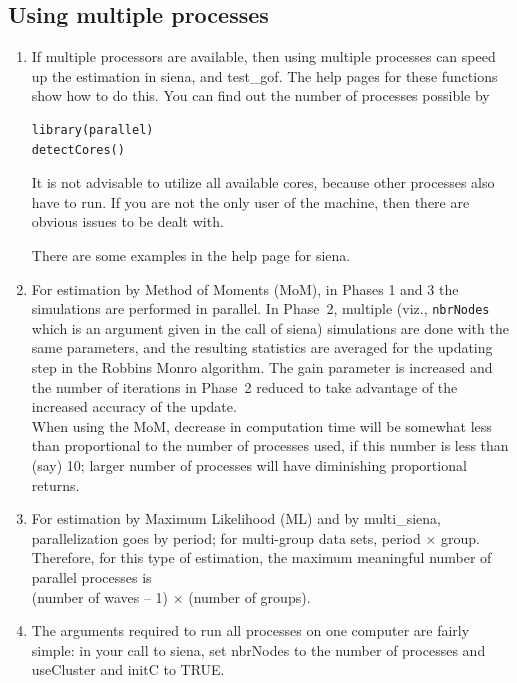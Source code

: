 \documentclass[a4paper,fleqn,11pt]{article}
\newcommand{\+}{\, + \,}
\newcommand{\sfn}[1]{\textsf{#1}}
\begin{document}
\subsection{Using multiple processes}
\label{S_multipleProcesses}
\begin{enumerate}
\item
  If multiple processors are available, then using
  multiple processes can speed up the estimation in \textsf{siena},
  and \textsf{test\_gof}.
  The help pages for these functions show how to do this.
  You can find out the number of processes possible by
\begin{verbatim}
library(parallel)
detectCores()
\end{verbatim}
  It is not advisable to utilize all available cores, because
  other processes also have to run. If you are not the only user
  of the machine, then there are obvious issues to be dealt with.

  There are some examples in the help page for \textsf{siena}.
\item For estimation by Method of Moments (MoM), in Phases 1 and 3
  the simulations are performed in parallel. In Phase~2,
  multiple (viz., \texttt{nbrNodes} which is an argument
  given in the call of \sfn{siena}) simulations are done with the same parameters,
  and the resulting statistics are averaged for the updating step in the
  Robbins Monro algorithm. The gain parameter is increased and the
  number of iterations in Phase~2 reduced to take advantage of
  the increased accuracy of the update.\\
  When using the MoM, decrease in computation time will be somewhat less
  than proportional to the number of processes used, if this number is less than
  (say) 10; larger number of processes will have diminishing proportional
  returns.

\item For estimation by Maximum Likelihood (ML) and by \sfn{multi\_siena},
  parallelization goes by period; for multi-group data sets, period $\times$
  group. Therefore, for this type of estimation, the maximum meaningful number
  of parallel processes is \\ (number of waves -- 1) $\times$ (number of groups).

\item The arguments required to run all processes on one computer are fairly
  simple: in your call to \textsf{siena}, set \sfn{nbrNodes} to the number of
  processes and \sfn{useCluster} and \sfn{initC} to TRUE.


\end{enumerate}
\end{document}
